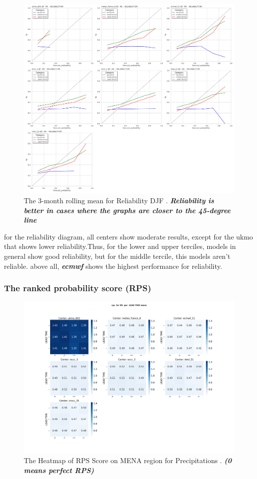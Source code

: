 \begin{figure}[H]
\centering
\includegraphics[scale=0.3]{plots/prob/rela/rela_diagram_RR_djf.png}
\caption{The 3-month rolling mean for Reliability DJF   . \textbf{\textit{Reliability is better in cases where the graphs are closer to the 45-degree line}}}
\end{figure}

for the reliability diagram, all centers show moderate results, except for the ukmo that shows lower reliability.Thus, for the lower and upper terciles, models in general show good reliability, but for the middle tercile, this models aren't reliable. above all, \textbf{\textit{ecmwf}}  shows the highest performance for reliability.


\subsubsection{The ranked probability score (RPS)}


\begin{figure}[H]
    \centering
    \includegraphics[scale=0.25]{plots/prob/rps/rps_RR_mena.png}
    \caption{The Heatmap of  RPS Score on MENA region for Precipitations    . \textbf{\textit{(0 means perfect RPS)}}}
\end{figure}

